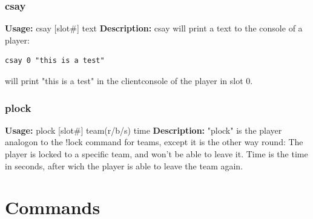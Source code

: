 \documentclass[12pt,a4paper]{article}
\numberwithin{footnote}{page} %
\begin{document}
\subsubsection{csay}
\textbf{Usage:} \hfill csay [slot\#] text \linebreak
\textbf{Description:} \linebreak
csay will print a text to the console of a player:
\begin{lstlisting}
csay 0 "this is a test"
\end{lstlisting}
will print "this is a test" in the clientconsole of the player in slot 0.

\subsubsection{plock}
\textbf{Usage:} \hfill plock [slot\#] team(r/b/s) time \linebreak
\textbf{Description:} \linebreak
"plock" is the player analogon to the !lock command for teams, except it is the other way round:
The player is locked to a specific team, and won't be able to leave it.
Time is the time in seconds, after wich the player is able to leave the team again.

\section{Commands}

\newcommand{\inclkwcmds}{ }
\newcommand{\inclkwadmins}{ }

\ifthenelse{\boolean{onKW}}{\inclkwcmds}{}
\ifthenelse{\boolean{onKW}}{\inclkwadmins}{}
\end{document}
